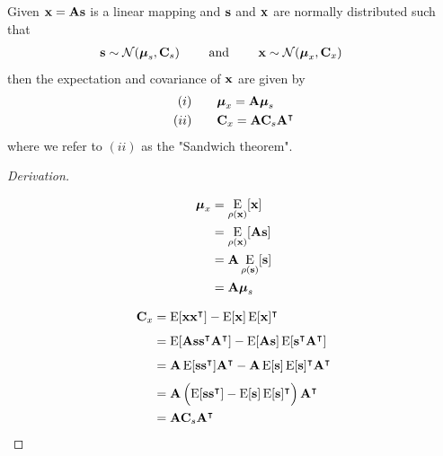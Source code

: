 \begin{theorem}
Given $\mathbf{x} = \mathbf{A s}$ is a linear mapping and $\mathbf{s}$ and $\mathbf{x}$ are normally distributed such that
\begin{align*}
	\mathbf{s} \sim \mathcal{N}(\mathbf{\boldsymbol \mu}_s,\mathbf{C}_s) \qquad
	\text{ and } \qquad
	\mathbf{x} \sim \mathcal{N}(\mathbf{\boldsymbol \mu}_x,\mathbf{C}_x) \qquad
\end{align*}
then the expectation and covariance of $\mathbf{x}$ are given by
\begin{align*}
	(i)& \qquad \greekvec{\mu}_x = \mb{A} \greekvec{\mu}_s \\
	(ii)&  \qquad \mathbf{C}_x = \mathbf{A} \mathbf{C}_s \mathbf{A}\TT %
\end{align*}
where we refer to $(ii)$ as the "Sandwich theorem".
\end{theorem}

\begin{proof}[Derivation]
\qquad \\
\begin{minipage}{0.45\textwidth}
\begin{align*}
	\mathbf{\boldsymbol \mu}_x &= \operatorname*{\mathrm{E}}_{\rho(\mathbf{x})}[\mathbf{x}] \\
	                 &= \operatorname*{\mathrm{E}}_{\rho(\mathbf{x})}[\mathbf{A s}] \\
	                 &= \mathbf{A} \operatorname*{\mathrm{E}}_{\rho(\mathbf{s})}[\mathbf{s}] \\
	                 &= \mathbf{A} \mathbf{\boldsymbol \mu}_s \\
\end{align*}
\end{minipage}
\begin{minipage}{0.45\textwidth}
\begin{align*}
	\mathbf{C}_x &= \operatorname*{\mathrm{E}}_{}[\mathbf{x x}^\intercal] - \operatorname*{\mathrm{E}}_{}[\mathbf{x}] \operatorname*{\mathrm{E}}_{}[\mathbf{x}]^\intercal \\
		     &= \operatorname*{\mathrm{E}}_{}[\mathbf{A s s }^\intercal \mathbf{A}^\intercal] 
				    - \operatorname*{\mathrm{E}}_{}[\mathbf{A s}] \operatorname*{\mathrm{E}}_{}[\mathbf{s}^\intercal \mathbf{A}^\intercal] \\
				 &= \mathbf{A} \operatorname*{\mathrm{E}}_{}[\mathbf{s s}^\intercal] \mathbf{A}^\intercal 
				    - \mathbf{A} \operatorname*{\mathrm{E}}_{}[\mathbf{s}] \operatorname*{\mathrm{E}}_{}[\mathbf{s}]^\intercal \mathbf{A}^\intercal \\
				 &= \mathbf{A} \left(\operatorname*{\mathrm{E}}_{}[\mathbf{s s}^\intercal] - \operatorname*{\mathrm{E}}_{}[\mathbf{s}] \operatorname*{\mathrm{E}}_{}[\mathbf{s}]^\intercal \right) \mathbf{A}^\intercal \\
				 &= \mathbf{A} \mathbf{C}_s \mathbf{A}^\intercal \\
\end{align*}
\end{minipage}
\newline
\end{proof}

